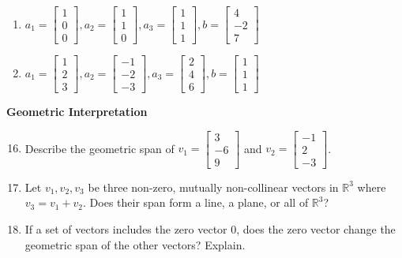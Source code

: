 \documentclass[12pt]{article}
\begin{document}
\begin{enumerate}
    \item $a_1 = \begin{bmatrix} 1 \\ 0 \\ 0 \end{bmatrix}, a_2 = \begin{bmatrix} 1 \\ 1 \\ 0 \end{bmatrix}, a_3 = \begin{bmatrix} 1 \\ 1 \\ 1 \end{bmatrix}, b = \begin{bmatrix} 4 \\ -2 \\ 7 \end{bmatrix}$
    \item $a_1 = \begin{bmatrix} 1 \\ 2 \\ 3 \end{bmatrix}, a_2 = \begin{bmatrix} -1 \\ -2 \\ -3 \end{bmatrix}, a_3 = \begin{bmatrix} 2 \\ 4 \\ 6 \end{bmatrix}, b = \begin{bmatrix} 1 \\ 1 \\ 1 \end{bmatrix}$
\end{enumerate}

\textbf{Geometric Interpretation} 
\begin{enumerate}
\setcounter{enumi}{15}
    \item Describe the geometric span of $v_1 = \begin{bmatrix} 3 \\ -6 \\ 9 \end{bmatrix}$ and $v_2 = \begin{bmatrix} -1 \\ 2 \\ -3 \end{bmatrix}$.
    \item Let $v_1, v_2, v_3$ be three non-zero, mutually non-collinear vectors in $\mathbb{R}^3$ where $v_3 = v_1 + v_2$. Does their span form a line, a plane, or all of $\mathbb{R}^3$?
    \item If a set of vectors includes the zero vector $0$, does the zero vector change the geometric span of the other vectors? Explain.
\end{enumerate}
\end{document}
